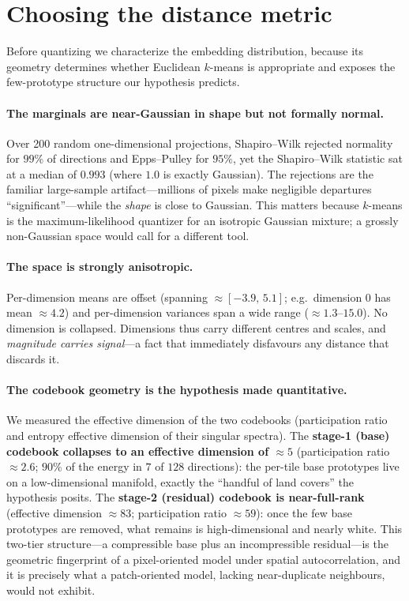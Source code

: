 \documentclass[11pt]{article}
\begin{document}
\section{Choosing the distance metric}
\label{sec:metric}

Before quantizing we characterize the embedding distribution, because its
geometry determines whether Euclidean $k$-means is appropriate and exposes the
few-prototype structure our hypothesis predicts.

\paragraph{The marginals are near-Gaussian in shape but not formally normal.}
Over 200 random one-dimensional projections, Shapiro--Wilk rejected normality
for $99\%$ of directions and Epps--Pulley for $95\%$, yet the Shapiro--Wilk
statistic sat at a median of $0.993$ (where $1.0$ is exactly Gaussian). The
rejections are the familiar large-sample artifact---millions of pixels make
negligible departures ``significant''---while the \emph{shape} is close to
Gaussian. This matters because $k$-means is the maximum-likelihood quantizer for
an isotropic Gaussian mixture; a grossly non-Gaussian space would call for a
different tool.

\paragraph{The space is strongly anisotropic.}
Per-dimension means are offset (spanning ${\approx}[-3.9,\,5.1]$; e.g.\ dimension
0 has mean ${\approx}4.2$) and per-dimension variances span a wide range
(${\approx}1.3$--$15.0$). No dimension is collapsed. Dimensions thus carry
different centres and scales, and \emph{magnitude carries signal}---a fact that
immediately disfavours any distance that discards it.

\paragraph{The codebook geometry is the hypothesis made quantitative.}
We measured the effective dimension of the two codebooks (participation ratio
and entropy effective dimension of their singular spectra). The \textbf{stage-1
(base) codebook collapses to an effective dimension of ${\approx}5$}
(participation ratio ${\approx}2.6$; $90\%$ of the energy in $7$ of $128$
directions): the per-tile base prototypes live on a low-dimensional manifold,
exactly the ``handful of land covers'' the hypothesis posits. The
\textbf{stage-2 (residual) codebook is near-full-rank} (effective dimension
${\approx}83$; participation ratio ${\approx}59$): once the few base prototypes
are removed, what remains is high-dimensional and nearly white. This two-tier
structure---a compressible base plus an incompressible residual---is the
geometric fingerprint of a pixel-oriented model under spatial autocorrelation,
and it is precisely what a patch-oriented model, lacking near-duplicate
neighbours, would not exhibit.
\end{document}
